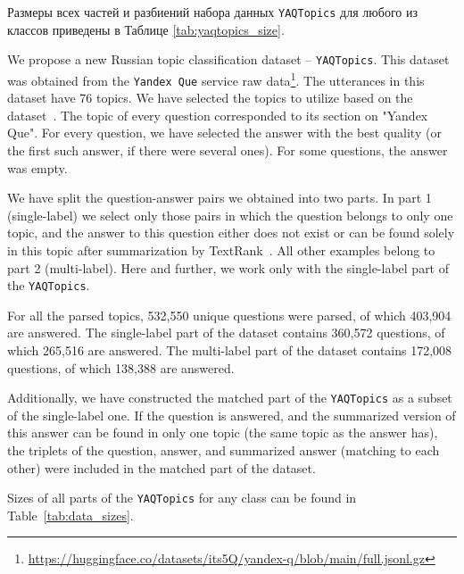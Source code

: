 Размеры всех частей и разбиений набора данных \texttt{YAQTopics} для любого из классов приведены в Таблице \ref{tab:yaqtopics_size}.

We propose a new Russian topic classification dataset -- \texttt{YAQTopics}. This dataset was obtained from the \texttt{Yandex Que} service raw data\footnote{\url{https://huggingface.co/datasets/its5Q/yandex-q/blob/main/full.jsonl.gz}}. The utterances in this dataset have 76 topics. We have selected the topics to utilize based on the dataset~\cite{dp_topics}. The topic of every question corresponded to its section on "Yandex Que". For every question, we have selected the answer with the best quality (or the first such answer, if there were several ones). For some questions, the answer was empty.



 We have split the question-answer pairs we obtained into two parts. In part 1 (single-label) we select only those pairs in which the question belongs to only one topic, and the answer to this question either does not exist or can be found solely in this topic after summarization by TextRank~\cite{summarizer}. All other examples belong to part 2 (multi-label). Here and further, we work only with the single-label part of the \texttt{YAQTopics}.

 For all the parsed topics, 532,550 unique questions were parsed, of which 403,904 are answered. The single-label part of the dataset contains 360,572 questions, of which 265,516 are answered. The multi-label part of the dataset contains 172,008 questions, of which 138,388 are answered. 

 Additionally, we have constructed the matched part of the \texttt{YAQTopics} as a subset of the single-label one. If the question is answered, and the summarized version of this answer can be found in only one topic (the same topic as the answer has), the triplets of the question, answer, and summarized answer (matching to each other) were included in the matched part of the dataset. 
 
Sizes of all parts of the \texttt{YAQTopics} for any class can be found in Table~\ref{tab:data_sizes}. 

